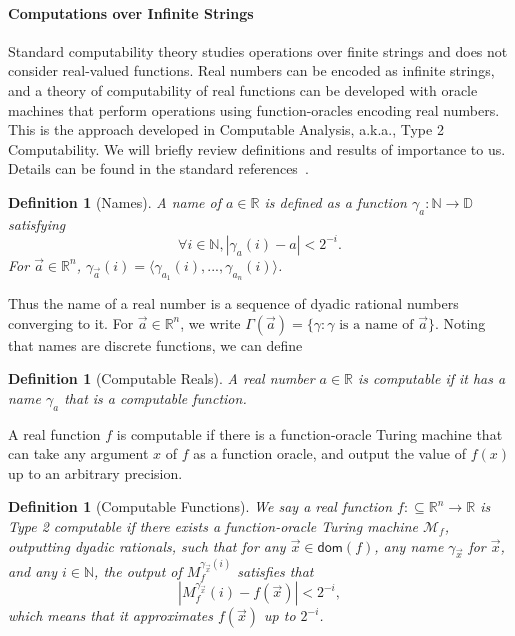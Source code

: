 \documentclass[10pt]{article}
\theoremstyle{plain}
\newtheorem{definition}[theorem]{Definition}
\theoremstyle{definition}
\newcommand{\dom}{\mathsf{dom}}
\begin{document}
\paragraph{Computations over Infinite Strings} Standard computability theory studies operations over finite strings and does not consider real-valued functions. Real numbers can be encoded as infinite strings, and a theory of computability of real functions can be developed with oracle machines that perform operations using function-oracles encoding real numbers. This is the approach developed in Computable Analysis, a.k.a., Type 2 Computability. We will briefly review definitions and results of importance to us. Details can be found in the standard references~\cite{CAbook,Kobook,vasco}.

\begin{definition}[Names]
A name of $a\in \mathbb{R}$ is defined as a function $\mathcal{\gamma}_a: \mathbb{N}\rightarrow \mathbb{D}$ satisfying 
$$\forall i\in \mathbb{N}, |\gamma_a(i) - a|<2^{-i}.$$
For $\vec a\in \mathbb{R}^n$, $\gamma_{\vec a}(i) = \langle \gamma_{a_1}(i), ..., \gamma_{a_n}(i)\rangle$.  
\end{definition}
Thus the name of a real number is a sequence of dyadic rational numbers converging to it. For $\vec a\in \mathbb{R}^n$, we write $\Gamma(\vec a) = \{\gamma: \gamma\mbox{ is a name of }\vec a\}$. Noting that names are discrete functions, we can define
\begin{definition}[Computable Reals]
A real number $a\in \mathbb{R}$ is computable if it has a name $\gamma_{a}$ that is a computable function. 
\end{definition}

A real function $f$ is computable if there is a function-oracle Turing machine that can take any argument $x$ of $f$ as a function oracle, and output the value of $f(x)$ up to an arbitrary precision. 

\begin{definition}[Computable Functions]
We say a real function $f:\subseteq\mathbb{R}^n\rightarrow \mathbb{R}$ is Type 2 computable if there exists a function-oracle Turing machine $\mathcal{M}_f$, outputting dyadic rationals, such that for any $\vec x \in \dom(f)$, any name $\gamma_{\vec x}$ for $\vec x$, and any $i \in \mathbb{N}$, the output of $M_f^{\gamma_{\vec x}(i)}$ satisfies that  
$$|M_f^{\gamma_{\vec x}}(i) - f(\vec x)|<2^{-i},$$
which means that it approximates $f(\vec x)$ up to $2^{-i}$. 
\end{definition}
\end{document}
